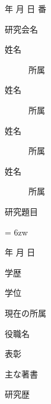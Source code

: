 \documentclass[a4paper,uplatex,12pt]{jsarticle}
\begin{document}
	\vspace*{-1.6zh}
	\hspace{-3zw}年\hspace{2zw} 月\hspace{2zw} 日 \hspace{3zw} 番
    
    \begin{minipage}[t]{0.4\textwidth}
    \vspace*{0.1zh}\hspace*{-5zw}
    研究会名
    \end{minipage}
    \begin{minipage}[t]{0.6\textwidth}
    \begin{description}
    	\item[姓名] 所属
    	\item[姓名] 所属
    	\item[姓名] 所属
    	\item[姓名] 所属 
    \end{description}	
    \end{minipage}
    
    \vspace{5zh}
    研究題目
    
    \vspace{1.5zh}
    \parindent = 6zw
    	
    
    \hspace{2zw} 年\hspace{3.3zw} 月\hspace{3.3zw} 日\hspace{6zw} \sout{\phantom{学生}}~\Ovalbox{\phantom{一般}}
    
    学歴
    
    学位
    
    現在の所属
    
    役職名
    
    表彰
    
    主な著書
    
    研究歴
    		
\end{document}
